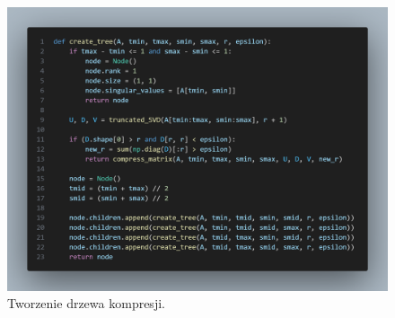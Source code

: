 \documentclass[11pt, leqno]{scrartcl}
\begin{document}
    \begin{figure}[H]
        \centering
        \includegraphics[width=1\linewidth]{create_tree.png}
        \caption{Tworzenie drzewa kompresji.}
    \end{figure}
\end{document}
